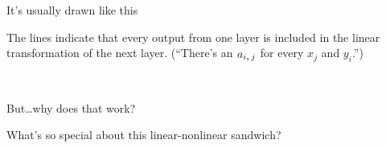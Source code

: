 \documentclass[aspectratio=169]{beamer}
\begin{document}
\begin{frame}{It's usually drawn like this}
\vspace{0.25 cm}

\vspace{0.25 cm}
The lines indicate that every output from one layer is included in the linear transformation of the next layer. (``There's an $a_{i\mbox{,\,}j}$ for every $x_j$ and $y_i$.'')
\end{frame}

\begin{frame}{\mbox{ }}
\begin{center}
\LARGE
But\ldots why does that work?

\vspace{1 cm}
What's so special about this linear-nonlinear sandwich?

\vspace{1 cm}
\large
{}
\end{center}
\end{frame}
\end{document}
